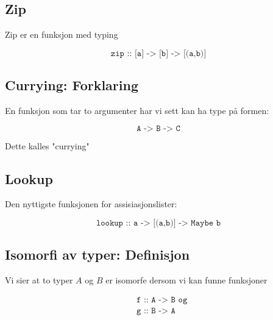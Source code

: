 \documentclass{article}
\begin{document}
    \subsection{Zip}

    Zip er en funksjon med typing

    \[ \texttt{zip :: [a] -> [b] -> [(a,b)]} \]

    \subsection{Currying: Forklaring}

    En funksjon som tar to argumenter har vi sett kan ha type på formen:

    \[ \texttt{A -> B -> C} \]

    Dette kalles "currying" 

    \subsection{Lookup}

    Den nyttigste funksjonen for assisiasjonslister:

    \[ \texttt{lookup :: a -> [(a,b)] -> Maybe b} \]

    \subsection{Isomorfi av typer: Definisjon}
    Vi sier at to typer \( A \) og \( B \) er isomorfe dersom vi kan funne funksjoner

    \begin{align*}
        &\texttt{f :: A -> B og}\\
        &\texttt{g :: B -> A}
    \end{align*}
\begin{figure}[H]
	\centering
\end{figure}
\end{document}
